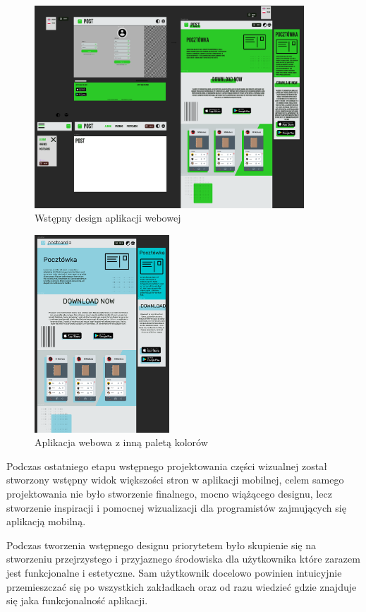\documentclass[a4paper,twoside,12pt]{book}
\begin{document}
\begin{figure}[H]
    \centering
    \includegraphics[width=0.9\textwidth]{wizje_ss/figma-web-green.png}
    \caption{Wstępny design aplikacji webowej}
\end{figure}
\begin{figure}[H]
    \centering
    \includegraphics[width=0.45\textwidth]{wizje_ss/figma-web-blue.png}
    \caption{Aplikacja webowa z inną paletą kolorów}
\end{figure}
\newpage

Podczas ostatniego etapu wstępnego projektowania części wizualnej został stworzony wstępny widok większości stron w aplikacji mobilnej, celem samego projektowania nie było stworzenie finalnego, mocno wiążącego designu, lecz stworzenie inspiracji i pomocnej wizualizacji dla programistów zajmujących się aplikacją mobilną.

Podczas tworzenia wstępnego designu priorytetem było skupienie się na stworzeniu przejrzystego i przyjaznego środowiska dla użytkownika które zarazem jest funkcjonalne i estetyczne. Sam użytkownik docelowo powinien intuicyjnie przemieszczać się po wszystkich zakładkach oraz od razu wiedzieć gdzie znajduje się jaka funkcjonalność aplikacji.
\end{document}
